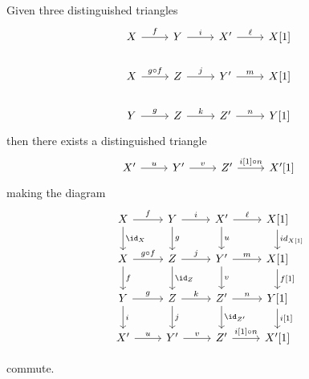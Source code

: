 \documentclass[10pt]{amsart}
\begin{document}
\begin{defn}
\begin{description}[style=nextline]
    \item[TR4]\label{TR4}
      Given three distinguished triangles
      $$\begin{tikzcd}
        X \arrow{r}{f} & Y \arrow{r}{i} & X^\prime \arrow{r}{\ell} & X[1]\\
        X \arrow{r}{g \circ f} & Z \arrow{r}{j} & Y^\prime \arrow{r}{m} & X[1]\\
        Y \arrow{r}{g} & Z \arrow{r}{k} & Z^\prime \arrow{r}{n} & Y[1]
      \end{tikzcd}$$
      then there exists a distinguished triangle
      $$\begin{tikzcd}
        X^\prime \arrow{r}{u} & Y^\prime \arrow{r}{v} & Z^\prime \arrow{r}{i[1]\circ n} & X^\prime[1]
      \end{tikzcd}$$
      making the diagram
      $$\begin{tikzcd}
        X\arrow{d}{\id_X}\arrow{r}{f} & Y\arrow{r}{i}\arrow{d}{g} & X^\prime\arrow{r}{\ell}\arrow{d}{u} & X[1]\arrow{d}{id_{X[1]}}\\
        X \arrow{d}{f}\arrow{r}{g \circ f} & Z\arrow{r}{j}\arrow{d}{\id_Z} & Y^\prime\arrow{r}{m}\arrow{d}{v} & X[1]\arrow{d}{f[1]}\\
        Y\arrow{r}{g}\arrow{d}{i} & Z \arrow{r}{k}\arrow{d}{j} & Z^\prime \arrow{r}{n}\arrow{d}{\id_{Z^\prime}} & Y[1]\arrow{d}{i[1]}\\
        X^\prime \arrow{r}{u} & Y^\prime \arrow{r}{v} & Z^\prime \arrow{r}{i[1] \circ n} & X^\prime[1]
      \end{tikzcd}$$
  \end{description}
\end{defn}
commute.
\end{document}
